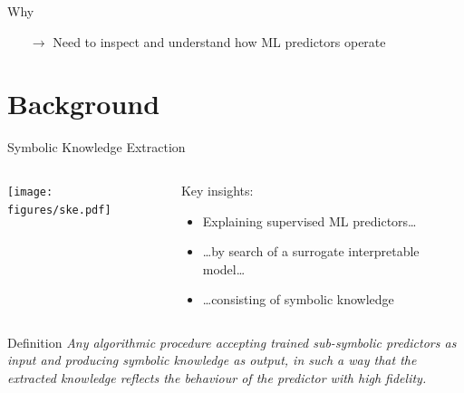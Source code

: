 \documentclass[presentation]{beamer}\mode<presentation>{\usetheme{AMSBolognaFC}}
\begin{document}
\begin{frame}[c]{Why}
\begin{itemize}
        \vfill

        \item[$\rightarrow$] Need to \alert{inspect} and understand how ML predictors operate
    \end{itemize}
\end{frame}

\section{Background}

\begin{frame}[allowframebreaks]{Symbolic Knowledge Extraction}
    \begin{columns}
        \begin{column}{0.19\linewidth}
            \texttt{[image: figures/ske.pdf]}
        \end{column}
        \hfill
        \begin{column}{0.8\linewidth}
            Key insights:
            \medskip
            \begin{itemize}
                \item Explaining \alert{supervised ML} predictors\ldots
                \medskip
                \item \ldots by search of a \alert{surrogate} interpretable model\ldots
                \medskip
                \item \ldots consisting of \alert{symbolic knowledge}
            \end{itemize}
        \end{column}
    \end{columns}

    \framebreak

    \begin{block}{Definition}\centering\itshape
        Any \alert{algorithmic} procedure accepting \alert{trained} sub-symbolic predictors as input and producing \alert{symbolic} knowledge as output, in such a way that the extracted knowledge reflects the behaviour of the predictor with high \alert{fidelity}.
    \end{block}

    \framebreak


\end{frame}
\end{document}

